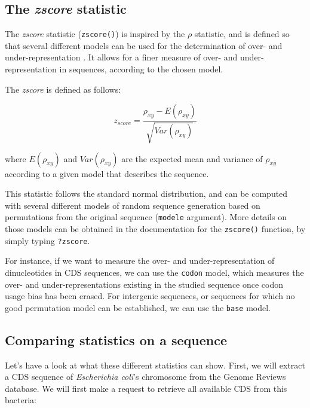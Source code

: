 \documentclass{article}
\begin{document}
\subsection{The \textit{zscore} statistic}

The \textit{zscore} statistic (\texttt{zscore()}) is inspired by the
$\rho$ statistic, and is defined so that several different models can
be used for the determination of over- and under-representation
\cite{UV}. It allows for a finer measure of over- and
under-representation in sequences, according to the chosen model.

The \textit{zscore} is defined as follows:

$$z_{score}=\frac{\rho_{xy}-E(\rho_{xy})}{\sqrt{Var(\rho_{xy})}}$$

where $E(\rho_{xy})$ and $Var(\rho_{xy})$ are the expected mean and
variance of $\rho_{xy}$ according to a given model that describes the
sequence.

This statistic follows the standard normal distribution, and can be
computed with several different models of random sequence generation
based on permutations from the original sequence (\texttt{modele}
argument). More details on those models can be obtained in the
documentation for the \texttt{zscore()} function, by simply typing
\texttt{?zscore}.

For instance, if we want to measure the over- and under-representation
of dinucleotides in CDS sequences, we can use the \texttt{codon}
model, which measures the over- and under-representations existing in
the studied sequence once codon usage bias has been erased. For
intergenic sequences, or sequences for which no good permutation model
can be established, we can use the \texttt{base} model. 

\subsection{Comparing statistics on a sequence}

Let's have a look at what these different statistics can show. First,
we will extract a CDS sequence of \textit{Escherichia coli}'s
chromosome from the Genome Reviews database. We will first make a
request to retrieve all available CDS from this bacteria:

\begin{Schunk}
\end{Schunk}
\end{document}
